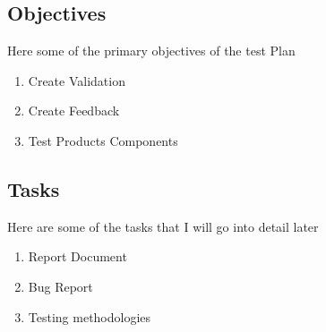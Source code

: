 \subsection{Objectives}
Here some of the primary  objectives of the test Plan
\begin{enumerate}
  \item  Create Validation
  \item  Create Feedback
  \item  Test Products Components  

\end{enumerate}
\subsection{Tasks}
Here are some of the tasks that I will go into detail later


\begin{enumerate}
  \item  Report Document
  \item  Bug  Report
  \item  Testing methodologies

\end{enumerate}
